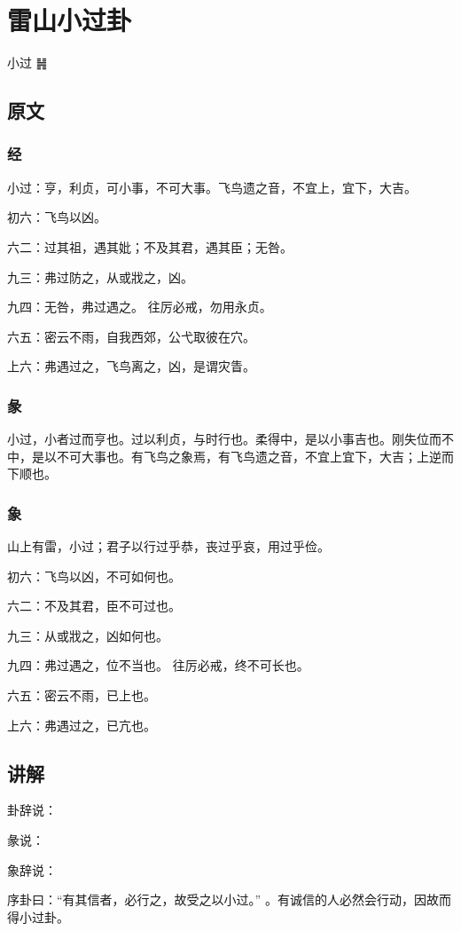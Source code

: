 \documentclass[12pt,oneside]{book}
\begin{document}
\chapter{雷山小过卦}
小过 {\LARGE ䷽}

\section{原文}
\subsection{经}
小过：亨，利贞，可小事，不可大事。飞鸟遗之音，不宜上，宜下，大吉。

初六：飞鸟以凶。

六二：过其祖，遇其妣；不及其君，遇其臣；无咎。

九三：弗过防之，从或戕之，凶。

九四：无咎，弗过遇之。 往厉必戒，勿用永贞。

六五：密云不雨，自我西郊，公弋取彼在穴。

上六：弗遇过之，飞鸟离之，凶，是谓灾眚。

\subsection{彖}
小过，小者过而亨也。过以利贞，与时行也。柔得中，是以小事吉也。刚失位而不中，是以不可大事也。有飞鸟之象焉，有飞鸟遗之音，不宜上宜下，大吉；上逆而下顺也。

\subsection{象}
山上有雷，小过；君子以行过乎恭，丧过乎哀，用过乎俭。

初六：飞鸟以凶，不可如何也。

六二：不及其君，臣不可过也。

九三：从或戕之，凶如何也。

九四：弗过遇之，位不当也。 往厉必戒，终不可长也。

六五：密云不雨，已上也。

上六：弗遇过之，已亢也。

\section{讲解}
卦辞说：

彖说：

象辞说：

序卦曰：“有其信者，必行之，故受之以小过。” 。有诚信的人必然会行动，因故而得小过卦。
\end{document}
